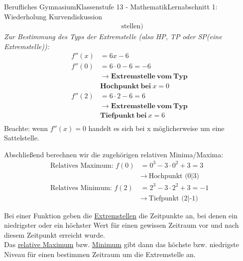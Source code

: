 \documentclass[11pt,twocolumn,oneside,openany,headings=optiontotoc,11pt,numbers=noenddot]{article}
\begin{document}
\begin{worksheet}{Berufliches Gymnasium}{Klassenstufe 13 - Mathematik}{Lernabschnitt 1: Wiederholung Kurvendiskussion}
\begin{align*}
			& \text{stellen})
		\end{align*}
		\textit{Zur Bestimmung des Typs der Extremstelle (also HP, TP oder SP(eine Extremstelle)):}
		\begin{align*}
			f''(x) & = 6x - 6\\
			f''(0) & = 6\cdot{}0 - 6 = -6\\
			& \rightarrow \mathbf{Extremstelle\ vom\ Typ}\\
			& \mathbf{Hochpunkt\ bei\ } x = 0\\
			f''(2) & = 6\cdot{}2 - 6 = 6\\
			& \rightarrow \mathbf{Extremstelle\ vom\ Typ}\\
			& \mathbf{Tiefpunkt\ bei\ } x = 6\\
		\end{align*}
		Beachte: wenn \(f''(x) = 0\) handelt es sich bei x möglicherweise um eine Sattelstelle.\\
		\par\bigskip\noindent
		Abschließend berechnen wir die zugehörigen relativen Minima/Maxima:
		\begin{align*}
			\text{Relatives Maximum: } f(0) & = 0^3 -3\cdot{}0^2 + 3 = 3\\
			& \rightarrow\ \text{Hochpunkt (0|3)}\\
			\text{Relatives Minimum: } f(2) & = 2^3 -3\cdot{}2^2 + 3 = -1\\
			& \rightarrow\ \text{Tiefpunkt (2|-1)}
		\end{align*}
		\begin{framed}
			\noindent
			Bei einer Funktion geben die \underline{Extremstellen} die Zeitpunkte an, bei denen ein niedrigster oder ein höchster Wert für einen gewissen Zeitraum vor und nach diesem Zeitpunkt erreicht wurde.\\
			Das \underline{relative Maximum} bzw. \underline{Minimum} gibt dann das höchste bzw. niedrigste Niveau für einen bestimmen Zeitraum um die Extremstelle an.
		\end{framed}

\end{worksheet}
\end{document}
